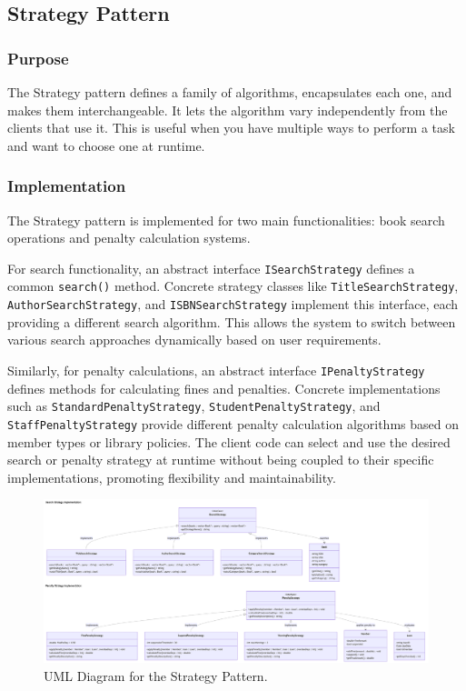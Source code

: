 \newpage

\subsection{Strategy Pattern}
\subsubsection{Purpose}
The Strategy pattern defines a family of algorithms, encapsulates each one, and makes them interchangeable. It lets the algorithm vary independently from the clients that use it. This is useful when you have multiple ways to perform a task and want to choose one at runtime.

\subsubsection{Implementation}
The Strategy pattern is implemented for two main functionalities: book search operations and penalty calculation systems. 

For search functionality, an abstract interface \texttt{ISearchStrategy} defines a common \texttt{search()} method. Concrete strategy classes like \texttt{TitleSearchStrategy}, \texttt{AuthorSearchStrategy}, and \texttt{ISBNSearchStrategy} implement this interface, each providing a different search algorithm. This allows the system to switch between various search approaches dynamically based on user requirements.

Similarly, for penalty calculations, an abstract interface \texttt{IPenaltyStrategy} defines methods for calculating fines and penalties. Concrete implementations such as \texttt{StandardPenaltyStrategy}, \texttt{StudentPenaltyStrategy}, and \texttt{StaffPenaltyStrategy} provide different penalty calculation algorithms based on member types or library policies. The client code can select and use the desired search or penalty strategy at runtime without being coupled to their specific implementations, promoting flexibility and maintainability.

\begin{figure}[H]
    \centering
    \includegraphics[width=1\textwidth]{figures/strategy_pattern.png}
    \caption{UML Diagram for the Strategy Pattern.}
    \label{fig:strategy_pattern}
\end{figure}

